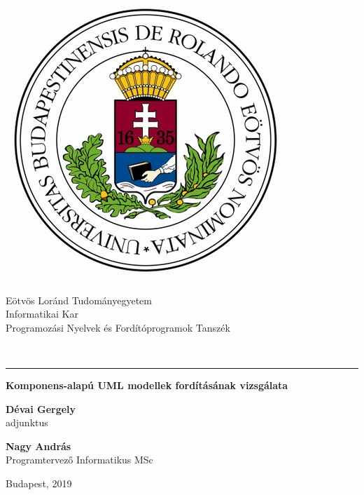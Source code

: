 \begin{titlepage}

\begin{minipage}{0.40\linewidth}
\includegraphics[scale=0.3]{elte-cimer}
\end{minipage}
\begin{minipage}{0.50\linewidth}
\begin{center}
Eötvös Loránd Tudományegyetem \\
Informatikai Kar \\
Programozási Nyelvek és Fordítóprogramok Tanszék
\end{center}
\end{minipage} \\

\hrule
\vfill

\begin{center}
\Huge
\textbf{Komponens-alapú UML modellek fordításának vizsgálata}
\normalsize
\end{center}

\vfill

\begin{minipage}[t]{0.5\linewidth}
\begin{flushleft}
\textbf{Dévai Gergely} \\
adjunktus
\end{flushleft}
\end{minipage}
\begin{minipage}[t]{0.5\linewidth}
\begin{flushright}
\textbf{Nagy András} \\
Programtervező Informatikus MSc
\end{flushright}
\end{minipage}

\vfill

\begin{center}
Budapest, 2019
\end{center}

\end{titlepage}